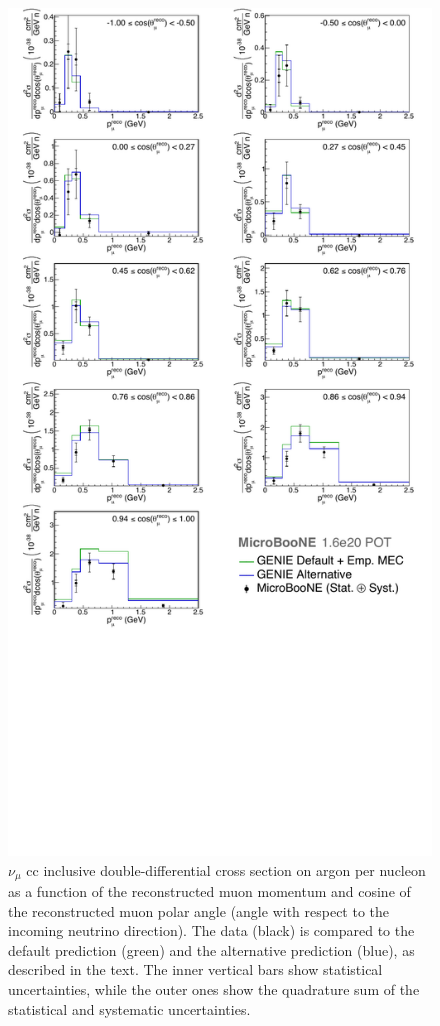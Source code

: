 \begin{figure}[]
\centering
\includegraphics[width=.90\textwidth]{images/XSecFinal/xsec_bigger} %
\caption[Double-Differential Cross Section in $\cos\theta_\mu$ Bins (Stat. $\oplus$ Syst. Unc.)]{$\nu_\mu$ \acrshort{cc} inclusive double-differential cross section on argon per nucleon as a function of the reconstructed muon momentum and cosine of the reconstructed muon polar angle (angle with respect to the incoming neutrino direction). The data (black) is compared to the default \g prediction (green) and the alternative \g prediction (blue), as described in the text.  The inner vertical bars show statistical uncertainties, while the outer ones show the quadrature sum of the statistical and systematic uncertainties.}
\label{fig:trkcostheta_trkmumom__xsec_anglesplit}
\end{figure}

